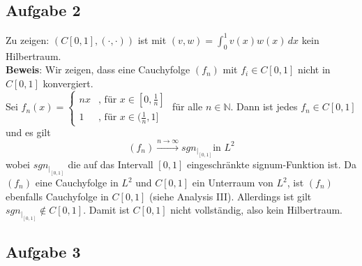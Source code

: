 \documentclass[11pt,a4paper,ngerman]{article}
\begin{document}
\subsection*{Aufgabe 2}
Zu zeigen: $(C[0,1],(\cdot,\cdot))$ ist mit $(v,w) = \int_0^1 v(x)w(x)\,dx$ kein Hilbertraum. \\
\textbf{Beweis}: Wir zeigen, dass eine Cauchyfolge $\left( f_n \right)$ mit $f_i \in C[0,1]$
                 nicht in $C[0,1]$ konvergiert. \\

  Sei $f_n (x) = \begin{cases}
                nx & \text{, für $x \in [0,\frac{1}{n}]$} \\
                1 & \text{, für $x \in (\frac{1}{n},1]$}
             \end{cases}$ für alle $n \in \mathbb{N}$. Dann ist jedes $f_n \in C[0,1]$ und es gilt
  \begin{equation*}
    \left( f_n \right) \stackrel{n \to \infty}{\longrightarrow} sgn_{{\left. \right|}_{[0,1]}} \text{in $L^2$}
  \end{equation*}
  wobei $sgn_{{\left. \right|}_{[0,1]}}$ die auf das Intervall $[0,1]$ eingeschränkte signum-Funktion ist.
  Da $\left(f_n\right)$ eine Cauchyfolge in $L^2$ und $C[0,1]$ ein Unterraum von $L^2$,
  ist $\left(f_n\right)$ ebenfalls Cauchyfolge in $C[0,1]$ (siehe Analysis III).
  Allerdings ist gilt $ sgn_{{\left. \right|}_{[0,1]}} \notin C[0,1]$.
  Damit ist $C[0,1]$ nicht vollständig, also kein Hilbertraum.
  
\subsection*{Aufgabe 3}

\label{LastPage}
\end{document}
